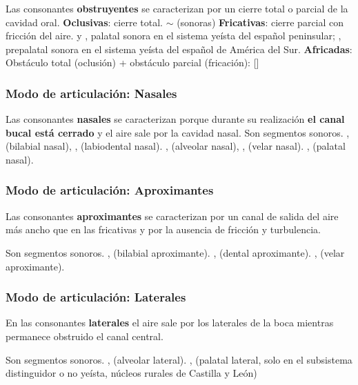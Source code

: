\documentclass[12pt]{article}
\begin{document}
	Las consonantes \textbf{obstruyentes} se caracterizan por un cierre total o parcial de la cavidad oral.
	\pex
\a \textbf{Oclusivas}: cierre total. \textipa{[p][t][k]} $\sim$ \textipa{[b][d][g]} (sonoras) 
\a \textbf{Fricativas}: cierre parcial con fricción del aire. \textipa{[f],[T][s],[x]} y \textipa{[J]}, palatal sonora en el sistema yeísta del español peninsular; \textipa{[Z]}, prepalatal sonora en el sistema yeísta del español de América del Sur.
\a \textbf{Africadas}: Obstáculo total (oclusión) + obstáculo parcial (fricación): [\texttoptiebar{\textteshlig}]
\xe	




	\subsubsection{Modo de articulación: Nasales}
	Las consonantes \textbf{nasales}  se caracterizan porque durante su realización \textbf{el canal bucal está cerrado} y el aire sale por la cavidad nasal.
\pex Son segmentos sonoros.
\a	\textipa{[m]}, (bilabial nasal), \textipa{[M]}, (labiodental nasal). 
\a	\textipa{[n]}, (alveolar nasal), \textipa{[N]}, (velar nasal).
\a\relax	[\textltailn], (palatal nasal).
\xe
	


\subsubsection{Modo de articulación: Aproximantes}
Las consonantes \textbf{aproximantes} se caracterizan por un canal de salida del aire más ancho que en las fricativas y por la ausencia de fricción y turbulencia.

\pex Son segmentos sonoros.
\a \textipa{[B]}, (bilabial aproximante).
\a \textipa{[D]}, (dental aproximante).
\a	\textipa{[G]}, (velar aproximante).
\xe
 	 


\subsubsection{Modo de articulación: Laterales}
En las consonantes \textbf{laterales} el aire sale por los laterales de la boca mientras permanece obstruido el canal central.

\pex Son segmentos sonoros.
\a\relax \textipa{[l]}, (alveolar lateral).
\a\relax [\textlambda], (palatal lateral, solo en el subsistema distinguidor o no yeísta, núcleos rurales de Castilla y León)
\xe
\end{document}
